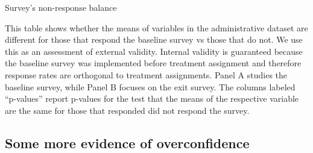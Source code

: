\documentclass[11pt]{article}
\begin{document}
\begin{table}[H]
\caption{Survey's non-response balance}
\label{balance_response}
\begin{center}
\scriptsize{}
\end{center}
 \scriptsize This table shows whether the means of variables in the administrative dataset are different for those that respond the baseline survey vs those that do not. We use this as an assessment of external validity. Internal validity is guaranteed because the baseline survey was implemented before treatment assignment and therefore response rates are orthogonal to treatment assignments. Panel A studies the baseline survey, while Panel B focuses on the exit survey. The columns labeled ``p-values'' report p-values for the test that the means of the respective variable are the same for those that responded did not respond the survey.
\end{table}

\newpage
\subsection{Some more evidence of overconfidence}
\end{document}
